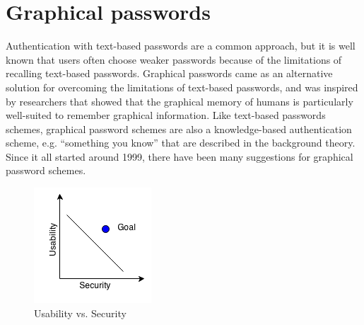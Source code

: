   \clearpage
  \section{Graphical passwords}



    Authentication with text-based passwords are a common approach, but it is well known that users often choose weaker passwords because of the limitations of recalling text-based passwords. Graphical passwords came as an alternative solution for overcoming the limitations of text-based passwords, and was inspired by researchers that showed that the graphical memory of humans is particularly well-suited to remember graphical information. 
    Like text-based passwords schemes, graphical password schemes are also a knowledge-based authentication scheme, e.g. ``something you know'' that are described in the background theory. Since it all started around 1999, there have been many suggestions for graphical password schemes. 

    \begin{figure}
      \vspace{-20pt}
      \begin{center}
        \includegraphics[scale=0.7]{pics/UsabilityVsSecurity.png}
      \end{center}
      \vspace{-20pt}
      \caption{Usability vs. Security}
      \vspace{-10pt}
    \end{figure}

